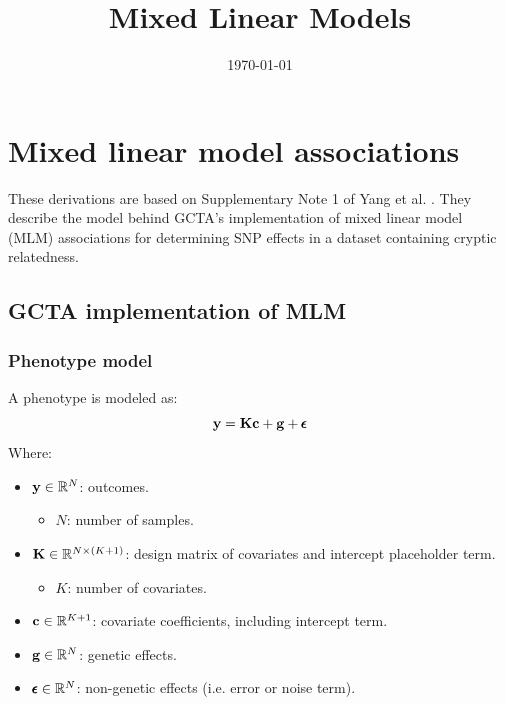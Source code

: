 \documentclass[12pt]{article}
\title{Mixed Linear Models}
\date{\today}
\begin{document}
\maketitle

\section{Mixed linear model associations}

These derivations are based on Supplementary Note 1 of Yang et al. \citep{yang2014natgen}. They describe the model behind GCTA's implementation of mixed linear model (MLM) associations for determining SNP effects in a dataset containing cryptic relatedness.

\subsection{GCTA implementation of MLM}

\subsubsection{Phenotype model}
A phenotype is modeled as:
$$ \mathbf{y} = \mathbf{K} \mathbf{c} + \mathbf{g} + \pmb{\epsilon} $$
Where:
\begin{itemize}
    \item $\mathbf{y} \in \mathbb{R}^N$: outcomes.
    \begin{itemize}
        \item $N$: number of samples.
    \end{itemize}
    \item $\mathbf{K} \in \mathbb{R}^{N \times (K+1)}$: design matrix of covariates and intercept placeholder term.
    \begin{itemize}
        \item $K$: number of covariates.
    \end{itemize}
    \item $\mathbf{c} \in \mathbb{R}^{K+1}$: covariate coefficients, including intercept term.
    \item $\mathbf{g} \in \mathbb{R}^N$: genetic effects.
    \item $\pmb{\epsilon} \in \mathbb{R}^N$: non-genetic effects (i.e. error or noise term).
\end{itemize}
\end{document}
